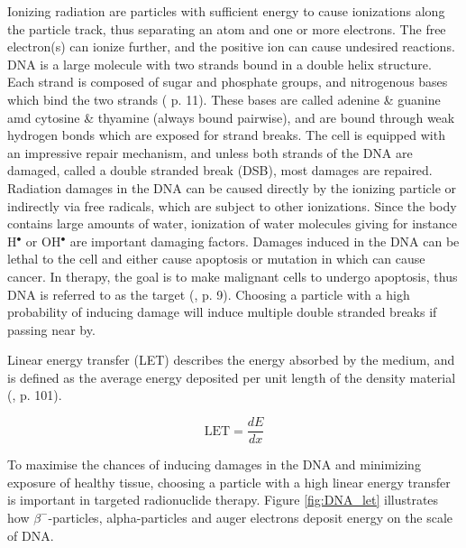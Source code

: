Ionizing radiation are particles with sufficient energy to cause ionizations along the particle track, thus separating an atom and one or more electrons. The free electron(s) can ionize further, and the positive ion can cause undesired reactions. DNA is a large molecule with two strands bound in a double helix structure. Each strand is composed of sugar and phosphate groups, and nitrogenous bases which bind the two strands (\cite{Douglass2018} p. 11). These  bases are called adenine \& guanine amd cytosine \& thyamine (always bound pairwise), and are bound through weak hydrogen bonds which are exposed for strand breaks. The cell is equipped with an impressive repair mechanism, and unless both strands of the DNA are damaged, called a double stranded break (DSB), most damages are repaired. Radiation damages in the DNA can be caused directly by the ionizing particle or indirectly via free radicals, which are subject to other ionizations. Since the body contains large amounts of water, ionization of water molecules giving for instance H$^\bullet$ or OH$^\bullet$ are important damaging factors. Damages induced in the DNA can be lethal to the cell and either cause apoptosis or mutation in which can cause cancer. In therapy, the goal is to make malignant cells to undergo apoptosis, thus DNA is referred to as the target (\cite{Douglass2018}, p. 9). Choosing a particle with a high probability of inducing damage will induce multiple double stranded breaks if passing near by. 

Linear energy transfer (LET) describes the energy absorbed by the medium, and is defined as the average energy deposited per unit length of the density material (\cite{Douglass2018}, p. 101). 



\begin{equation}
    \text{LET}=\frac{dE}{dx}
\end{equation}

To maximise the chances of inducing damages in the DNA and minimizing exposure of healthy tissue, choosing a particle with a high linear energy transfer is important in targeted radionuclide therapy. Figure \ref{fig:DNA_let} illustrates how $\beta^-$-particles, alpha-particles and auger electrons deposit energy on the scale of DNA. \\

